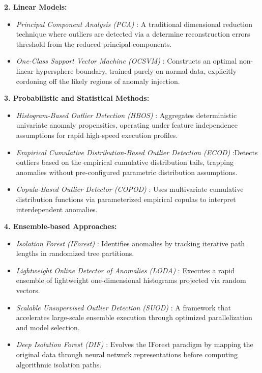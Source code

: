 \documentclass[final,twocolumn,10pt]{elsarticle}
\begin{document}
\textbf{2. Linear Models:}
\begin{itemize}
    \item \textit{Principal Component Analysis (PCA)} \cite{PCA}: A traditional dimensional reduction technique where outliers are detected via a determine reconstruction errors threshold from the reduced principal components.
    \item \textit{One-Class Support Vector Machine (OCSVM)} \cite{OCSVM}: Constructs an optimal non-linear hypersphere boundary, trained purely on normal data, explicitly cordoning off the likely regions of anomaly injection.
\end{itemize}

\textbf{3. Probabilistic and Statistical Methods:}
\begin{itemize}
    \item \textit{Histogram-Based Outlier Detection (HBOS)} \cite{HBOS}: Aggregates deterministic univariate anomaly propensities, operating under feature independence assumptions for rapid high-speed execution profiles.
    \item \textit{Empirical Cumulative Distribution-Based Outlier Detection (ECOD)} \cite{ECOD}:Detects outliers based on the empirical cumulative distribution tails, trapping anomalies without pre-configured parametric distribution assumptions.
    \item \textit{Copula-Based Outlier Detector (COPOD)} \cite{COPOD}: Uses multivariate cumulative distribution functions via parameterized empirical copulas to interpret interdependent anomalies.
\end{itemize}

\textbf{4. Ensemble-based Approaches:}
\begin{itemize}
    \item \textit{Isolation Forest (IForest)} \cite{IForest}: Identifies anomalies by tracking iterative path lengths in randomized tree partitions.
    \item \textit{Lightweight Online Detector of Anomalies (LODA)} \cite{LODA}: Executes a rapid ensemble of lightweight one-dimensional histograms projected via random vectors.
    \item \textit{Scalable Unsupervised Outlier Detection (SUOD)} \cite{zhao2020suod}: A framework that accelerates large-scale ensemble execution through optimized parallelization and model selection.
    \item \textit{Deep Isolation Forest (DIF)} \cite{DIF}: Evolves the IForest paradigm by mapping the original data through neural network representations before computing algorithmic isolation paths.
\end{itemize}
\end{document}
